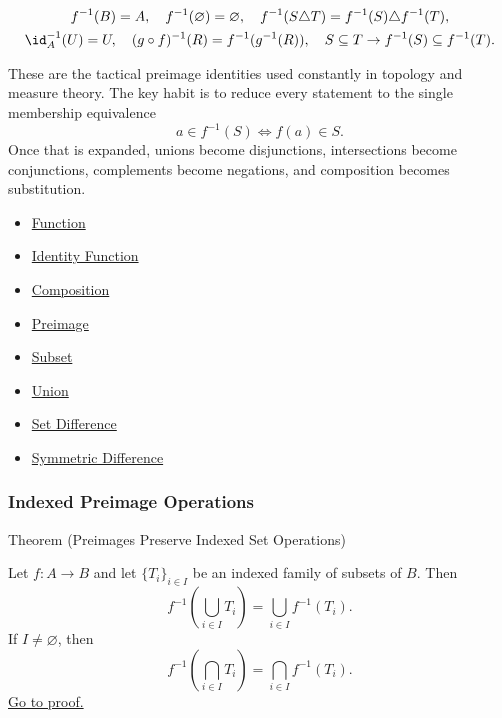 \begin{remark*}
\[
\begin{gathered}
f^{-1}(B)=A,\quad
f^{-1}(\varnothing)=\varnothing,\quad
f^{-1}(S\triangle T)=f^{-1}(S)\triangle f^{-1}(T),\\
\id_A^{-1}(U)=U,\quad
(g\circ f)^{-1}(R)=f^{-1}(g^{-1}(R)),\quad
S\subseteq T\to f^{-1}(S)\subseteq f^{-1}(T).
\end{gathered}
\]
\end{remark*}

\begin{remark*}[Interpretation]
These are the tactical preimage identities used constantly in topology and
measure theory.  The key habit is to reduce every statement to the single
membership equivalence
\[
a\in f^{-1}(S) \iff f(a)\in S.
\]
Once that is expanded, unions become disjunctions, intersections become
conjunctions, complements become negations, and composition becomes
substitution.
\end{remark*}

\begin{dependencies}
\begin{itemize}
  \item \hyperref[def:function]{Function}
  \item \hyperref[def:identity]{Identity Function}
  \item \hyperref[def:composition]{Composition}
  \item \hyperref[def:preimage]{Preimage}
  \item \hyperref[def:subset]{Subset}
  \item \hyperref[def:union]{Union}
  \item \hyperref[def:set-difference]{Set Difference}
  \item \hyperref[def:sym-diff]{Symmetric Difference}
\end{itemize}
\end{dependencies}

\subsubsection*{Indexed Preimage Operations}

\begin{theorembox}{Theorem (Preimages Preserve Indexed Set Operations)}
\begin{theorem}\label{thm:indexed-preimage-ops}
Let $f:A\to B$ and let $\{T_i\}_{i\in I}$ be an indexed family of subsets of
$B$. Then
\[
f^{-1}\!\left(\bigcup_{i\in I}T_i\right)
=
\bigcup_{i\in I}f^{-1}(T_i).
\]
If $I\neq\varnothing$, then
\[
f^{-1}\!\left(\bigcap_{i\in I}T_i\right)
=
\bigcap_{i\in I}f^{-1}(T_i).
\]
\hyperref[prf:indexed-preimage-ops]{Go to proof.}
\end{theorem}
\end{theorembox}

